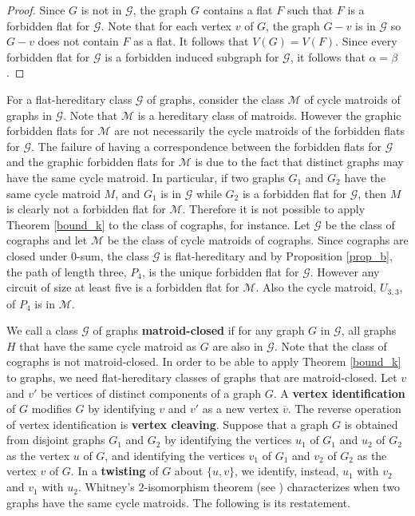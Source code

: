 \documentclass[11pt]{amsart}
\theoremstyle{definition}
\theoremstyle{remark}
\numberwithin{equation}{section}
\begin{document}
\begin{proof}
Since $G$ is not in $\mathcal{G}$, the graph $G$ contains a flat $F$ such that $F$ is a forbidden flat for $\mathcal{G}$. Note that for each vertex $v$ of $G$, the graph $G-v$ is in $\mathcal{G}$ so $G-v$ does not contain $F$ as a flat. It follows that $V(G)=V(F)$. Since every forbidden flat for $\mathcal{G}$ is a forbidden induced subgraph for $\mathcal{G}$, it follows that $\alpha = \beta$. 
\end{proof}







For a flat-hereditary class $\mathcal{G}$ of graphs, consider the class $\mathcal{M}$ of cycle matroids of graphs in $\mathcal{G}$. Note that $\mathcal{M}$ is a hereditary class of matroids. However the  graphic forbidden flats for $\mathcal{M}$ are not necessarily the cycle matroids of the forbidden flats for $\mathcal{G}$. The failure of having a correspondence between the forbidden flats for $\mathcal{G}$ and the graphic forbidden flats for $\mathcal{M}$ is due to the fact that distinct graphs may have the same cycle matroid. In particular, if two graphs $G_1$ and $G_2$ have the same cycle matroid $M$, and $G_1$ is in $\mathcal{G}$ while $G_2$ is a forbidden flat for $\mathcal{G}$, then $M$ is clearly not a forbidden flat for $\mathcal{M}$. Therefore it is not possible to apply Theorem \ref{bound_k} to the class of cographs, for instance. Let $\mathcal{G}$ be the class of cographs and let $\mathcal{M}$ be the class of cycle matroids of cographs. Since cographs are closed under $0$-sum, the class $\mathcal{G}$ is flat-hereditary and by Proposition \ref{prop_b}, the path of length three, $P_4$, is the unique forbidden flat for $\mathcal{G}$. However any circuit of size at least five is a forbidden flat for $\mathcal{M}$. Also the cycle matroid, $U_{3,3}$, of $P_4$ is in $\mathcal{M}$.

We call a class $\mathcal{G}$ of graphs \textbf{matroid-closed} if for any graph $G$ in $\mathcal{G}$, all graphs $H$ that have the same cycle matroid as $G$ are also in $\mathcal{G}$. Note that the class of cographs is not matroid-closed. In order to be able to apply Theorem \ref{bound_k} to graphs, we need flat-hereditary classes of graphs that are matroid-closed. Let $v$ and $v'$ be vertices of distinct components of a graph $G$. A \textbf{vertex identification} of $G$ modifies $G$ by identifying $v$ and $v'$ as a new vertex $\overline{v}$. The reverse operation of vertex identification is \textbf{vertex cleaving}. Suppose that a graph $G$ is obtained from disjoint graphs $G_1$ and $G_2$ by identifying the vertices $u_1$ of $G_1$ and $u_2$ of $G_2$ as the vertex $u$ of $G$, and identifying the vertices $v_1$ of $G_1$ and $v_2$ of $G_2$ as the vertex $v$ of $G$. In a \textbf{twisting} of $G$ about $\{u,v\}$, we identify, instead, $u_1$ with $v_2$ and $v_1$ with $u_2$. Whitney's $2$-isomorphism theorem (see \cite{ox2}) characterizes when two graphs have the same cycle matroids. The following is its restatement. 
\end{document}
